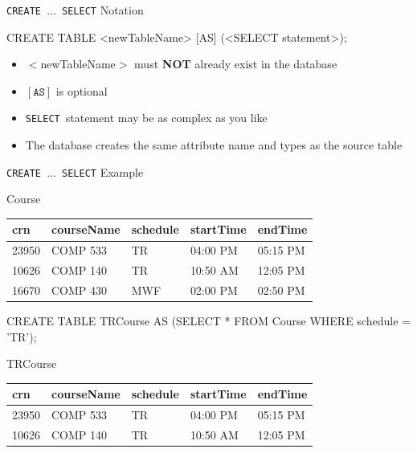 \documentclass[aspectratio=169]{beamer}
\newenvironment{noindentitemize}
{ \begin{itemize}
 \setlength{\itemsep}{1.5ex}
  \setlength{\parsep}{0pt}   
  \setlength{\parskip}{0pt}
 \addtolength{\leftskip}{-2em}
 }
{ \end{itemize} }
\newcommand{\AS}{\texttt{AS}}
\newcommand{\SELECT}{\texttt{SELECT}}
\begin{document}
\begin{frame}[fragile]{\texttt{CREATE $\ldots$ SELECT} Notation}


\begin{SQL}
CREATE TABLE <newTableName> [AS] 
	(<SELECT statement>);
\end{SQL}

\begin{noindentitemize}
\item $<$newTableName$>$ must \textbf{NOT} already exist in the database
\item $[\AS]$ is optional
\item \SELECT\ statement may be as complex as you like
\\
\item[] The database creates the same attribute name and types as the source table 
\end{noindentitemize}


\end{frame}


\begin{frame}[fragile]{\texttt{CREATE $\ldots$ SELECT} Example}

Course\\
\begin{tabular}{|l|l|l|l|l|} \hline
\textbf{crn} & \textbf{courseName} & \textbf{schedule} & \textbf{startTime} & \textbf{endTime}\\ \hline
23950 & COMP 533 & TR & 04:00 PM & 05:15 PM\\ \hline
10626 & COMP 140 & TR & 10:50 AM & 12:05 PM\\ \hline
16670 & COMP 430 & MWF & 02:00 PM & 02:50 PM \\ \hline
\end{tabular}


\begin{SQL}
CREATE TABLE TRCourse AS
	(SELECT *
	 FROM Course
	 WHERE schedule = 'TR');
\end{SQL}

TRCourse\\
\begin{tabular}{|l|l|l|l|l|} \hline
\textbf{crn} & \textbf{courseName} & \textbf{schedule} & \textbf{startTime} & \textbf{endTime}\\ \hline
23950 & COMP 533 & TR & 04:00 PM & 05:15 PM\\ \hline
10626 & COMP 140 & TR & 10:50 AM & 12:05 PM\\ \hline
\end{tabular}
\end{frame}
\end{document}
